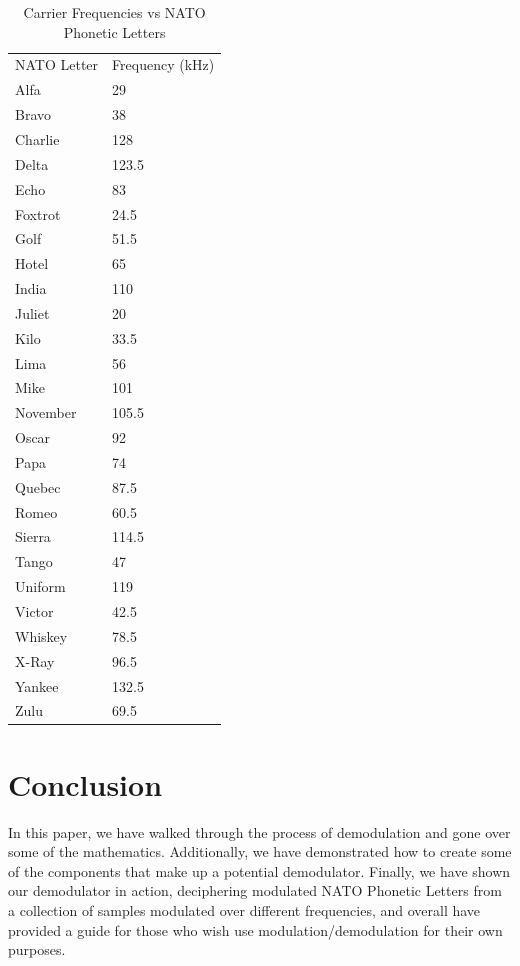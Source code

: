 \documentclass[journal]{IEEEtran}
\begin{document}
\begin{table}
\centering
\caption{Carrier Frequencies vs NATO Phonetic Letters}
\label{NATOTable}
\begin{tabular}{ll}
NATO Letter & Frequency (kHz) \\
Alfa        & 29              \\
Bravo       & 38              \\
Charlie     & 128             \\
Delta       & 123.5           \\
Echo        & 83              \\
Foxtrot     & 24.5            \\
Golf        & 51.5            \\
Hotel       & 65              \\
India       & 110             \\
Juliet      & 20              \\
Kilo        & 33.5            \\
Lima        & 56              \\
Mike        & 101             \\
November    & 105.5           \\
Oscar       & 92              \\
Papa        & 74              \\
Quebec      & 87.5            \\
Romeo       & 60.5            \\
Sierra      & 114.5           \\
Tango       & 47              \\
Uniform     & 119             \\
Victor      & 42.5            \\
Whiskey     & 78.5            \\
X-Ray       & 96.5            \\
Yankee      & 132.5           \\
Zulu        & 69.5           
\end{tabular}
\end{table}


\section{Conclusion}
In this paper, we have walked through the process of demodulation and gone over some of the mathematics. Additionally, we have demonstrated how to create some of the components that make up a potential demodulator. Finally, we have shown our demodulator in action, deciphering modulated NATO Phonetic Letters from a collection of samples modulated over different frequencies, and overall have provided a guide for those who wish use modulation/demodulation for their own purposes.
\end{document}
